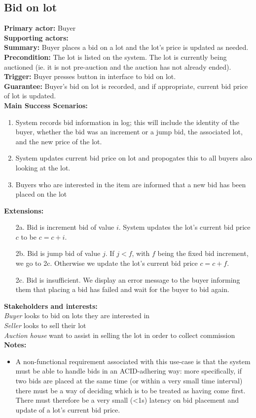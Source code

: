 \documentclass[titlepage, 12pt]{extarticle}
\begin{document}
\subsection{Bid on lot}
{\bf Primary actor: } Buyer
\\{\bf Supporting actors: } 
\\{\bf Summary: } Buyer places a bid on a lot and the lot's price is updated as needed. 
\\{\bf Precondition: } The lot is listed on the system. The lot is currently being auctioned (ie. it is not pre-auction and the auction has not already ended).  
\\{\bf Trigger: } Buyer presses button in interface to bid on lot.
\\{\bf Guarantee: } Buyer's bid on lot is recorded, and if appropriate, current bid price of lot is updated. 
\\{\bf Main Success Scenarios: } 
\begin{enumerate}
\item System records bid information in log; this will include the identity of the buyer, whether the bid was an increment or a jump bid, the associated lot, and the new price of the lot. 
\item System updates current bid price on lot and propogates this to all buyers also looking at the lot. 
\item Buyers who are interested in the item are informed that a new bid has been placed on the lot
\end{enumerate}
  {\bf Extensions: }
\begin{itemize}
\item [2a.] Bid is increment bid of value $i$. System updates the lot's current bid price $c$ to be $c = c + i$.
\item [2b.] Bid is jump bid of value $j$. If $j < f$, with $f$ being the fixed bid increment, we go to 2c. Otherwise we update the lot's current bid price $c = c + f$.
\item [2c.] Bid is insufficient. We display an error message to the buyer informing them that placing a bid has failed and wait for the buyer to bid again. 
\end{itemize}
{\bf Stakeholders and interests: }
\\{\em Buyer} looks to bid on lots they are interested in
\\{\em Seller} looks to sell their lot
\\{\em Auction house} want to assist in selling the lot in order to collect commission
\\{\bf Notes:}
\begin{itemize}
  \item A non-functional requirement associated with this use-case is that the system must be able to handle bids in an ACID-adhering way: more specifically, if two bids are placed at the same time (or within a very small time interval) there must be a way of deciding which is to be treated as having come first. There must therefore be a very small (<1s) latency on bid placement and update of a lot's current bid price. 
\end{itemize}
\end{document}
